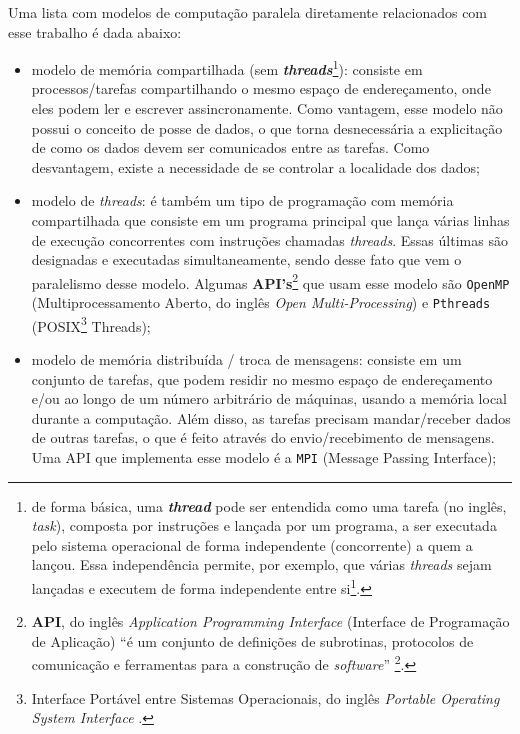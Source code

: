 		Uma lista com modelos de computação paralela diretamente relacionados 
		com esse trabalho é dada abaixo:    
        \begin{itemize}
            \item modelo de memória compartilhada (sem
            \textit{\textbf{threads}}\footnote{de forma básica, uma
            \textit{\textbf{thread}} pode ser entendida como uma tarefa 
            (no inglês, \textit{task}), composta por instruções e lançada por 
            um programa, a ser executada pelo sistema operacional de forma 
            independente (concorrente) a quem a lançou. Essa independência
            permite, por exemplo, que várias \textit{threads} sejam lançadas
            e executem de forma independente entre si\footcite{LLNL:pthreads}.}): 
	        consiste em processos/tarefas compartilhando o mesmo espaço de 
	        endereçamento, onde eles podem ler e escrever assincronamente. 
	        Como vantagem, esse modelo não possui o conceito de posse de 
	        dados, o que torna desnecessária a explicitação de como os dados 
	        devem ser comunicados entre as tarefas. Como desvantagem, existe
	        a necessidade de se controlar a  localidade dos dados;
            
            \item modelo de \textit{threads}: é também um tipo de programação 
            com memória compartilhada que consiste em um programa principal 
            que lança várias linhas de execução concorrentes com instruções 
            chamadas \textit{threads}. Essas últimas são designadas e 
            executadas simultaneamente, sendo desse fato que vem o 
            paralelismo desse modelo. Algumas 
            \textbf{API's}\footnote{\textbf{API}, do inglês 
            \textit{Application Programming Interface} (Interface de 
            Programação de Aplicação) ``é um conjunto de definições de 
            subrotinas, protocolos de comunicação e ferramentas para a 
            construção de \textit{software}'' \footcite{wiki:API}.}
            que usam esse modelo são \texttt{OpenMP} (Multiprocessamento Aberto, do inglês \textit{Open Multi-Processing}) 
            e \texttt{Pthreads} (POSIX\footnote{Interface Portável entre 
            Sistemas Operacionais, do inglês \textit{Portable Operating 
            System Interface} \cite{wiki:POSIX}.} Threads);
            
            \item modelo de memória distribuída / troca de mensagens: 
            consiste em um conjunto de tarefas, que podem residir no mesmo
            espaço de endereçamento e/ou ao longo de um número arbitrário de 
            máquinas, usando a memória local durante a computação. Além disso,
            as tarefas precisam mandar/receber dados de outras tarefas, o que
            é feito através do envio/recebimento de mensagens. Uma API que 
            implementa esse modelo é a \texttt{MPI} (Message Passing 
            Interface);
            

\end{itemize}
